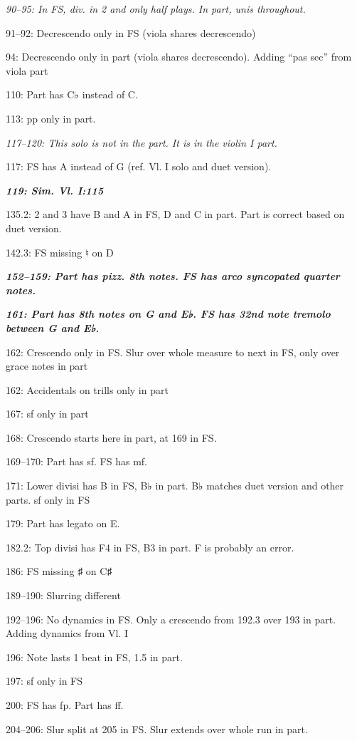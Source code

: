 \documentclass[twoside]{article}
\begin{document}
\begin{hangparas}{15pt}{1}
\begin{multicols}{2}
\textit{90--95: In FS, div. in 2 and only half plays. In part, unis throughout.}

91--92: Decrescendo only in FS (viola shares decrescendo)

94: Decrescendo only in part (viola shares decrescendo). Adding ``pas sec'' from viola part

110: Part has C♭ instead of C.

113: pp only in part.

\textit{117--120: This solo is not in the part. It is in the violin I part.}

117: FS has A instead of G (ref. Vl. I solo and duet version).

\textbf{\textit{119: Sim. Vl. I:115}}

135.2: 2 and 3 have B and A in FS, D and C in part. Part is correct based on duet version.

142.3: FS missing ♮ on D

\textbf{\textit{152--159: Part has pizz. 8th notes. FS has arco syncopated quarter notes.}}

\textbf{\textit{161: Part has 8th notes on G and E♭. FS has 32nd note tremolo between G and E♭.}}

162: Crescendo only in FS. Slur over whole measure to next in FS, only over grace notes in part

162: Accidentals on trills only in part

167: sf only in part

168: Crescendo starts here in part, at 169 in FS.

169--170: Part has sf. FS has mf.

171: Lower divisi has B in FS, B♭ in part. B♭ matches duet version and other parts. sf only in FS

179: Part has legato on E.

182.2: Top divisi has F4 in FS, B3 in part. F is probably an error.

186: FS missing ♯ on C♯

189--190: Slurring different

192--196: No dynamics in FS. Only a crescendo from 192.3 over 193 in part. Adding dynamics from Vl. I

196: Note lasts 1 beat in FS, 1.5 in part.

197: sf only in FS

200: FS has fp. Part has ff.

204--206: Slur split at 205 in FS. Slur extends over whole run in part.


\end{multicols}
\end{hangparas}
\end{document}
